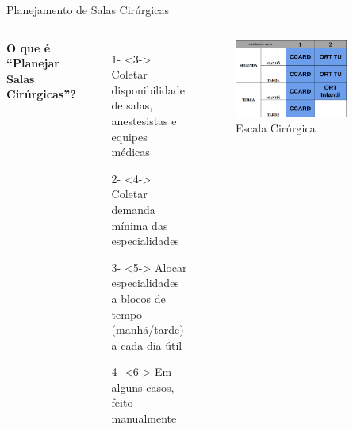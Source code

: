 \documentclass[10pt]{beamer}
\begin{document}
\begin{frame}{Planejamento de Salas Cirúrgicas}
    \begin{columns}[t]
        \textbf{O que é ``Planejar Salas Cirúrgicas''?}
        \begin{enumerate}
            \setlength\itemsep{.5em}
            \item[1-]<3-> Coletar disponibilidade de salas, anestesistas e equipes médicas
            \item[2-]<4-> Coletar demanda mínima das especialidades
            \item[3-]<5-> Alocar especialidades a blocos de tempo (manhã/tarde) a cada dia útil
            \item[4-]<6-> Em alguns casos, feito manualmente
        \end{enumerate}
        \begin{figure}
            \centering
            \includegraphics[width=0.8\textwidth]{images/schedule.png}
            \caption{Escala Cirúrgica\label{fig:schedule}}
        \end{figure}
    \end{columns}
\end{frame}
\end{document}
